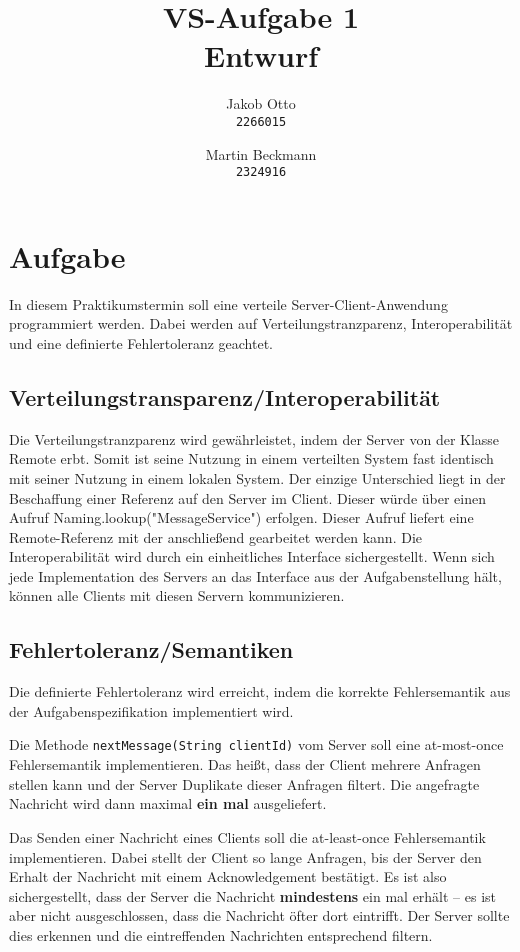 \documentclass[a4paper, 12pt]{scrartcl}
\author{Jakob Otto\\
	\texttt{2266015} \and Martin Beckmann\\
	\texttt{2324916}}
\title{VS-Aufgabe 1\\
       Entwurf}
\begin{document}
\maketitle
\newpage
	
\section{Aufgabe}
In diesem Praktikumstermin soll eine verteile Server-Client-Anwendung programmiert werden. Dabei werden auf Verteilungstranzparenz, Interoperabilität und eine definierte Fehlertoleranz geachtet.

\subsection{Verteilungstransparenz/Interoperabilität}
Die Verteilungstranzparenz wird gewährleistet, indem der Server von der Klasse Remote erbt. Somit ist seine Nutzung in einem verteilten System fast identisch mit seiner Nutzung in einem lokalen System. Der einzige Unterschied liegt in der Beschaffung einer Referenz auf den Server im Client. Dieser würde über einen Aufruf Naming.lookup("MessageService") erfolgen. Dieser Aufruf liefert eine Remote-Referenz mit der anschließend gearbeitet werden kann.
Die Interoperabilität wird durch ein einheitliches Interface sichergestellt. Wenn sich jede Implementation des Servers an das Interface aus der Aufgabenstellung hält, können alle Clients mit diesen Servern kommunizieren.

\subsection{Fehlertoleranz/Semantiken}
Die definierte Fehlertoleranz wird erreicht, indem die korrekte Fehlersemantik aus der Aufgabenspezifikation implementiert wird.

Die Methode \lstinline|nextMessage(String clientId)| vom Server soll eine \glqq{}at-most-once\grqq{} Fehlersemantik implementieren. Das heißt, dass der Client mehrere Anfragen stellen kann und der Server Duplikate dieser Anfragen filtert. Die angefragte Nachricht wird dann maximal \textbf{ein mal} ausgeliefert.

Das Senden einer Nachricht eines Clients soll die \glqq{}at-least-once\grqq{} Fehlersemantik implementieren. Dabei stellt der Client so lange Anfragen, bis der Server den Erhalt der Nachricht mit einem Acknowledgement bestätigt. Es ist also sichergestellt, dass der Server die Nachricht \textbf{mindestens} ein mal erhält -- es ist aber nicht ausgeschlossen, dass die Nachricht öfter dort eintrifft. Der Server sollte dies erkennen und die eintreffenden Nachrichten entsprechend filtern.
\end{document}
